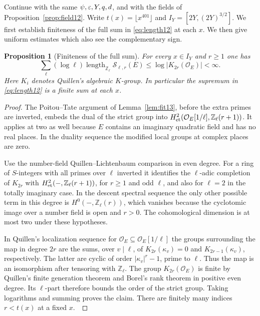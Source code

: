 \documentclass[a4paper,11pt]{article}
\newtheorem{proposition}{Proposition}[section]
\theoremstyle{definition}
\theoremstyle{remark}
\newcommand{\ZZ}{\mathbb Z}\newcommand{\ord}{\operatorname{ord}}
\newcommand{\len}{\operatorname{length}}\newcommand{\Res}{\operatorname*{Res}}
\numberwithin{equation}{section}
\begin{document}
Continue with the same \(\psi,\varepsilon,Y,q,d\), and with the fields of Proposition~\ref{prop:field12}. Write \(t(x)=\lfloor x^{401}\rfloor\) and \(I_Y=[2Y,(2Y)^{3/2}]\). We first establish finiteness of the full sum in \eqref{eq:length12} at each \(x\). We then give uniform estimates which also see the complementary sign.

\begin{proposition}[Finiteness of the full sum]\label{prop:finite15}
For every \(x\in I_Y\) and \(r\ge1\) one has
\[
 \sum_\ell(\log\ell)\len_{\ZZ_\ell}\mathcal S_{\ell,r}(E)
                  \le \log |K_{2r}(\mathcal O_E)|<\infty .
\]
Here \(K_i\) denotes Quillen's algebraic \(K\)-group. In particular the supremum in \eqref{eq:length12} is a finite sum at each \(x\).
\end{proposition}
\begin{proof}
The Poitou--Tate argument of Lemma~\ref{lem:fit13}, before the extra primes are inverted, embeds the dual of the strict group into \(H^2_{\rm et}(\mathcal O_E[1/\ell],\ZZ_\ell(r+1))\). It applies at two as well because \(E\) contains an imaginary quadratic field and has no real places. In the duality sequence the modified local groups at complex places are zero.~\cite{II-II-II-duality13}

Use the number-field Quillen--Lichtenbaum comparison in even degree. For a ring of \(S\)-integers with all primes over \(\ell\) inverted it identifies the \(\ell\)-adic completion of \(K_{2r}\) with \(H^2_{\rm et}(-,\ZZ_\ell(r+1))\), for \(r\ge1\) and odd \(\ell\), and also for \(\ell=2\) in the totally imaginary case. In the descent spectral sequence the only other possible term in this degree is \(H^0(-,\ZZ_\ell(r))\), which vanishes because the cyclotomic image over a number field is open and \(r>0\). The cohomological dimension is at most two under these hypotheses.~\cite[Ch.~VI, Sec.~8]{II-II-II-weibel15}\cite[Thm.~1]{II-II-II-kahn15}

In Quillen's localization sequence for \(\mathcal O_E\subseteq\mathcal O_E[1/\ell]\) the groups surrounding the map in degree \(2r\) are the sums, over \(v\mid\ell\), of \(K_{2r}(\kappa_v)=0\) and \(K_{2r-1}(\kappa_v)\), respectively. The latter are cyclic of order \(|\kappa_v|^r-1\), prime to \(\ell\). Thus the map is an isomorphism after tensoring with \(\ZZ_\ell\). The group \(K_{2r}(\mathcal O_E)\) is finite by Quillen's finite generation theorem and Borel's rank theorem in positive even degree. Its \(\ell\)-part therefore bounds the order of the strict group. Taking logarithms and summing proves the claim. There are finitely many indices \(r<t(x)\) at a fixed \(x\).~\cite{II-II-II-weibel15}
\end{proof}
\end{document}
